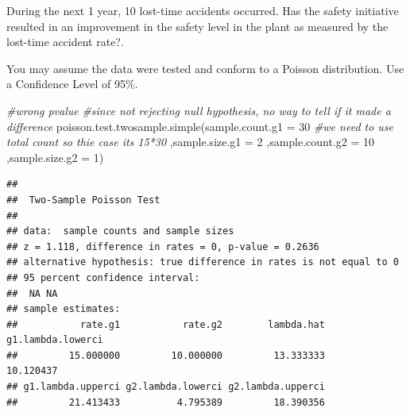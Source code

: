 \documentclass[
]{article}
\newenvironment{Shaded}{\begin{snugshade}}{\end{snugshade}}
\newcommand{\AttributeTok}[1]{\textcolor[rgb]{0.77,0.63,0.00}{#1}}
\newcommand{\CommentTok}[1]{\textcolor[rgb]{0.56,0.35,0.01}{\textit{#1}}}
\newcommand{\DecValTok}[1]{\textcolor[rgb]{0.00,0.00,0.81}{#1}}
\newcommand{\FunctionTok}[1]{\textcolor[rgb]{0.00,0.00,0.00}{#1}}
\newcommand{\NormalTok}[1]{#1}
\begin{document}
During the next 1 year, 10 lost-time accidents occurred. Has the safety
initiative resulted in an improvement in the safety level in the plant
as measured by the lost-time accident rate?.

You may assume the data were tested and conform to a Poisson
distribution. Use a Confidence Level of 95\%.

\begin{Shaded}
\begin{Highlighting}[]
\CommentTok{\#wrong pvalue}
\CommentTok{\#since not rejecting null hypothesis, no way to tell if it made a difference}
\FunctionTok{poisson.test.twosample.simple}\NormalTok{(}\AttributeTok{sample.count.g1 =} \DecValTok{30} \CommentTok{\#we need to use total count so thie case it\textquotesingle{}s 15*30}
\NormalTok{                              ,}\AttributeTok{sample.size.g1 =} \DecValTok{2}
\NormalTok{                              ,}\AttributeTok{sample.count.g2 =} \DecValTok{10}
\NormalTok{                              ,}\AttributeTok{sample.size.g2 =} \DecValTok{1}\NormalTok{)}
\end{Highlighting}
\end{Shaded}

\begin{verbatim}
## 
##  Two-Sample Poisson Test
## 
## data:  sample counts and sample sizes
## z = 1.118, difference in rates = 0, p-value = 0.2636
## alternative hypothesis: true difference in rates is not equal to 0
## 95 percent confidence interval:
##  NA NA
## sample estimates:
##           rate.g1           rate.g2        lambda.hat g1.lambda.lowerci 
##         15.000000         10.000000         13.333333         10.120437 
## g1.lambda.upperci g2.lambda.lowerci g2.lambda.upperci 
##         21.413433          4.795389         18.390356
\end{verbatim}
\end{document}
